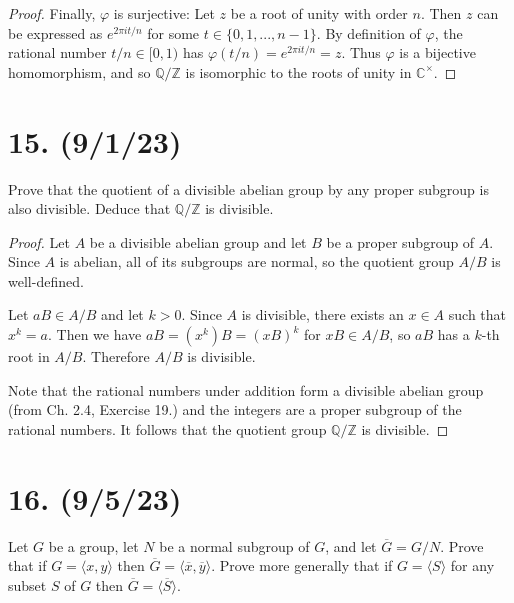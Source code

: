 \documentclass{article}
\begin{document}
\begin{enumerate}[label=(\alph*), itemsep=0em]
\begin{proof}
            Finally, $\varphi$ is surjective: Let $z$ be a root of unity with order $n$. Then $z$ can be expressed as $e^{2 \pi i t / n}$ for some $t \in \{ 0, 1, ..., n - 1 \}$. By definition of $\varphi$, the rational number $t/n \in [0, 1)$ has $\varphi(t/n) = e^{2 \pi i t / n} = z$. Thus $\varphi$ is a bijective homomorphism, and so $\mathbb{Q}/\mathbb{Z}$ is isomorphic to the roots of unity in $\mathbb{C}^\times$.
          \end{proof}
\end{enumerate}

\section*{15. (9/1/23)}

Prove that the quotient of a divisible abelian group by any proper subgroup is also divisible. Deduce that $\mathbb{Q}/\mathbb{Z}$ is divisible.

\begin{proof}
    Let $A$ be a divisible abelian group and let $B$ be a proper subgroup of $A$. Since $A$ is abelian, all of its subgroups are normal, so the quotient group $A/B$ is well-defined.

    Let $aB \in A/B$ and let $k > 0$. Since $A$ is divisible, there exists an $x \in A$ such that $x^k = a$. Then we have $aB = (x^k)B = (xB)^k$ for $xB \in A/B$, so $aB$ has a $k$-th root in $A/B$. Therefore $A/B$ is divisible.

    Note that the rational numbers under addition form a divisible abelian group (from Ch. 2.4, Exercise 19.) and the integers are a proper subgroup of the rational numbers. It follows that the quotient group $\mathbb{Q}/\mathbb{Z}$ is divisible.
\end{proof}

\section*{16. (9/5/23)}

Let $G$ be a group, let $N$ be a normal subgroup of $G$, and let $\overline{G} = G/N$. Prove that if $G = \langle x, y \rangle$ then $\overline{G} = \langle \overline{x}, \overline{y} \rangle$. Prove more generally that if $G = \langle S \rangle$ for any subset $S$ of $G$ then $\overline{G} = \langle \overline{S} \rangle$.
\end{document}
